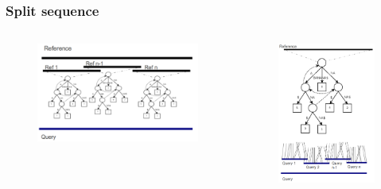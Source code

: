 \documentclass{beamer}
\begin{document}
\begin{frame}
  \frametitle{Split sequence}
  \begin{columns}
    \begin{column}{0.5\textwidth}
  \begin{figure}
    \includegraphics[scale=0.3]{split_ref.pdf}
  \end{figure}
  \end{column}
  \begin{column}{0.5\textwidth}
  \begin{figure}
    \includegraphics[scale=0.3]{split_qry.pdf}
  \end{figure}
\end{column}
\end{columns}
\end{frame}
\end{document}
